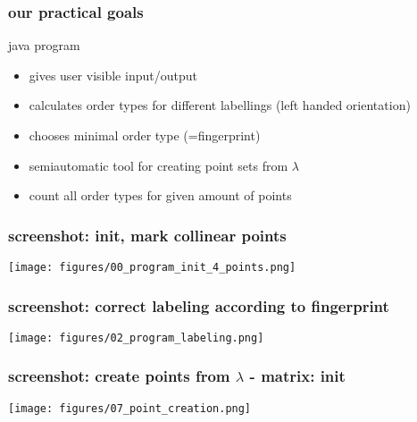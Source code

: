 \documentclass{beamer}
\newcommand*\tick{\item[\Checkmark]}
\newcommand*\fail{\item[\XSolidBrush]}
\newcommand*\hand{\item[\HandRight]}
\begin{document}
\begin{frame}
\frametitle{our practical goals}
java program
\begin{itemize}
\tick gives user visible input/output
\tick calculates order types for different labellings (left handed orientation)
\tick chooses minimal order type (=fingerprint)
\hand semiautomatic tool for creating point sets from $\lambda$
\fail count all order types for given amount of points
\end{itemize}
\end{frame}
\begin{frame}
\frametitle{screenshot: init, mark collinear points}
\texttt{[image: figures/00\_program\_init\_4\_points.png]}
\end{frame}
\begin{frame}
\frametitle{screenshot: correct labeling according to fingerprint}
\texttt{[image: figures/02\_program\_labeling.png]}
\end{frame}
\begin{frame}
\frametitle{screenshot: create points from $\lambda$ - matrix: init}
\texttt{[image: figures/07\_point\_creation.png]}
\end{frame}
\end{document}
